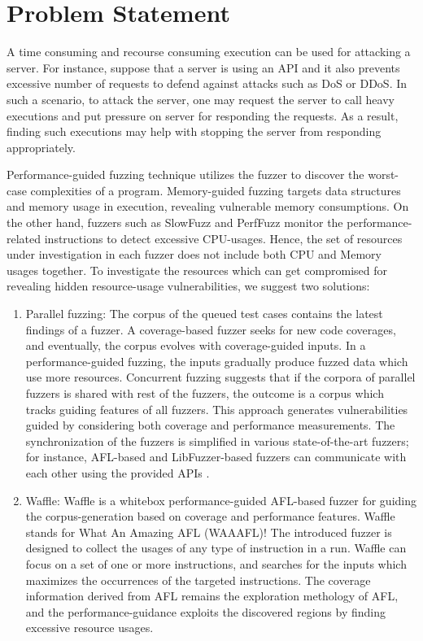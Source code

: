 \section{Problem Statement}

A time consuming and recourse consuming execution can be used for attacking a server. For instance, suppose that a server is using an API and it also prevents excessive number of requests to defend against attacks such as DoS or DDoS. In such a scenario, to attack the server, one may request the server to call heavy executions and put pressure on server for responding the requests. As a result, finding such executions may help with stopping the server from responding appropriately.

Performance-guided fuzzing technique utilizes the fuzzer to discover the worst-case complexities of a program. Memory-guided fuzzing targets data structures and memory usage in execution, revealing vulnerable memory consumptions. On the other hand, fuzzers such as SlowFuzz and PerfFuzz monitor the performance-related instructions to detect excessive CPU-usages. Hence, the set of resources under investigation in each fuzzer does not include both CPU and Memory usages together. To investigate the resources which can get compromised for revealing hidden resource-usage vulnerabilities, we suggest two solutions:

\begin{enumerate}
    \item Parallel fuzzing: The corpus of the queued test cases contains the latest findings of a fuzzer. A coverage-based fuzzer seeks for new code coverages, and eventually, the corpus evolves with coverage-guided inputs. In a performance-guided fuzzing, the inputs gradually produce fuzzed data which use more resources. Concurrent fuzzing suggests that if the corpora of parallel fuzzers is shared with rest of the fuzzers, the outcome is a corpus which tracks guiding features of all fuzzers. This approach generates vulnerabilities guided by considering both coverage and performance measurements. The synchronization of the fuzzers is simplified in various state-of-the-art fuzzers; for instance, AFL-based and LibFuzzer-based fuzzers can communicate with each other using the provided APIs \cite{afl_par}.
    
    \item Waffle: Waffle is a whitebox performance-guided AFL-based fuzzer for guiding the corpus-generation based on coverage and performance features. Waffle stands for What An Amazing AFL (WAAAFL)! The introduced fuzzer is designed to collect the usages of any type of instruction in a run. Waffle can focus on a set of one or more instructions, and searches for the inputs which maximizes the occurrences of the targeted instructions. The coverage information derived from AFL remains the exploration methology of AFL, and the performance-guidance exploits the discovered regions by finding excessive resource usages.
\end{enumerate}
